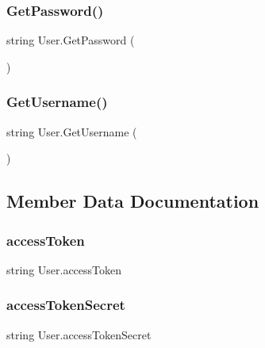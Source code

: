 \mbox{\label{class_user_a19477827d4e7de7ed4e1c3356aec3e81}} 
\subsubsection{\texorpdfstring{GetPassword()}{GetPassword()}}
{\footnotesize\ttfamily string User.\+Get\+Password (\begin{DoxyParamCaption}{ }\end{DoxyParamCaption})\hspace{0.3cm}{\ttfamily [inline]}}

\mbox{\label{class_user_a9b01c32e62c89a10e380f6cdfa19b8b0}} 
\subsubsection{\texorpdfstring{GetUsername()}{GetUsername()}}
{\footnotesize\ttfamily string User.\+Get\+Username (\begin{DoxyParamCaption}{ }\end{DoxyParamCaption})\hspace{0.3cm}{\ttfamily [inline]}}



\subsection{Member Data Documentation}
\mbox{\label{class_user_ac76de605e6cf755236947a31e98a6de9}} 
\subsubsection{\texorpdfstring{accessToken}{accessToken}}
{\footnotesize\ttfamily string User.\+access\+Token}

\mbox{\label{class_user_a79b7e9fe1c8c513722b937d961e5190c}} 
\subsubsection{\texorpdfstring{accessTokenSecret}{accessTokenSecret}}
{\footnotesize\ttfamily string User.\+access\+Token\+Secret}

